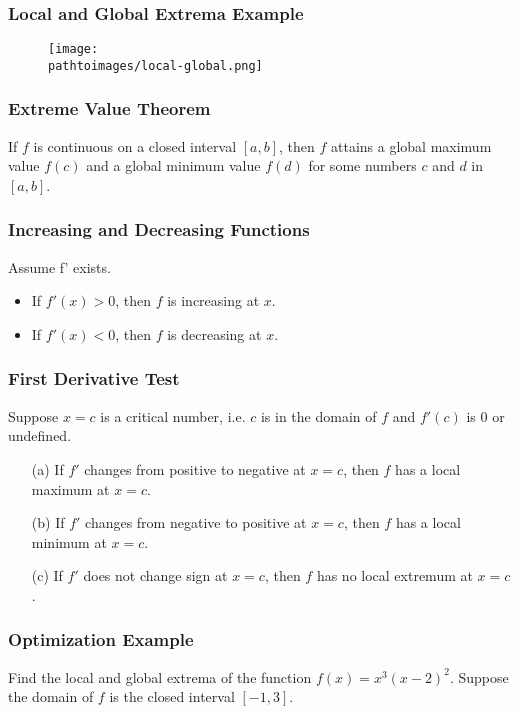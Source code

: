 \documentclass{beamer}
\newcommand{\pathtoimages}{/Users/charlesrambo/Desktop/Bootcamp24/Images}
\begin{document}
\begin{frame}
\frametitle{Local and Global Extrema Example}

\begin{figure}
\centering
\texttt{[image: \\pathtoimages/local-global.png]}
\end{figure}



\end{frame}

\begin{frame}
\frametitle{Extreme Value Theorem}

\begin{Theorem}
If $f$ is continuous on a closed interval $[a, b]$, then $f$ attains a global maximum value $f(c)$ and a global minimum value $f(d)$ for some numbers $c$ and $d$ in $[a, b]$.
\end{Theorem}

\end{frame}

\begin{frame}[t]
\frametitle{Increasing and Decreasing Functions}
Assume f' exists.
\begin{itemize}
\item If $f'(x) > 0 $, then $f$ is increasing at $x$.
\item If $f' (x) < 0$, then $f$ is decreasing at $x$.
\end{itemize}

\end{frame}

\begin{frame}
\frametitle{First Derivative Test}
Suppose $x = c$ is a critical number, i.e. $c$ is in the domain of $f$ and $f'(c)$ is 0 or undefined.
\begin{itemize}
\item[(a)] If $f'$ changes from positive to negative at $x = c$, then $f$ has a local maximum at $x = c$.
\item[(b)] If $f'$ changes from negative to positive at $x = c$, then $f$ has a local minimum at $x = c$.
\item[(c)] If $f'$ does not change sign at $x = c$, then $f$ has no local extremum at $x = c$.
\end{itemize}
\end{frame}

\begin{frame}[t]
\frametitle{Optimization Example}
\small
\begin{Example}
Find the local and global extrema of the function $f(x) = x^3(x-2)^2$. Suppose the domain of $f$ is the closed interval $[-1, 3]$.
\end{Example}
\end{frame}
\end{document}
